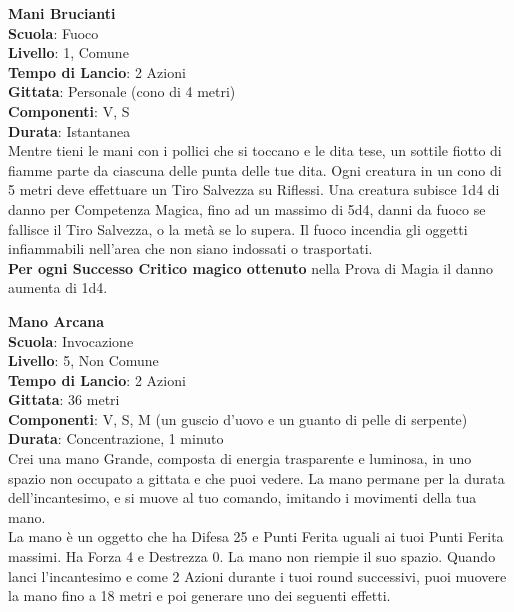 \begin{multicols}{2}
\medskip\textbf{Mani Brucianti}\\
\textbf{Scuola}: Fuoco\\
\textbf{Livello}: 1, Comune\\
\textbf{Tempo di Lancio}: 2 Azioni\\
\textbf{Gittata}: Personale (cono di 4 metri)\\
\textbf{Componenti}: V, S\\
\textbf{Durata}: Istantanea\\
Mentre tieni le mani con i pollici che si toccano e le dita tese, un sottile fiotto di fiamme parte da ciascuna delle punta delle tue dita. Ogni creatura in un cono di 5 metri deve effettuare un Tiro Salvezza su Riflessi. Una creatura subisce 1d4 di danno per Competenza Magica, fino ad un massimo di 5d4, danni da fuoco se fallisce il Tiro Salvezza, o la metà se lo supera. Il fuoco incendia gli oggetti infiammabili nell'area che non siano indossati o trasportati.\\
\textbf{Per ogni Successo Critico magico ottenuto} nella Prova di Magia il danno aumenta di 1d4.

\medskip\textbf{Mano Arcana}\\
\textbf{Scuola}: Invocazione\\
\textbf{Livello}: 5, Non Comune\\
\textbf{Tempo di Lancio}: 2 Azioni\\
\textbf{Gittata}: 36 metri\\
\textbf{Componenti}: V, S, M (un guscio d'uovo e un guanto di pelle di serpente)\\
\textbf{Durata}: Concentrazione, 1 minuto\\
Crei una mano Grande, composta di energia trasparente e luminosa, in uno spazio non occupato a gittata e che puoi vedere. La mano permane per la durata dell'incantesimo, e si muove al tuo comando, imitando i movimenti della tua mano.\\
La mano è un oggetto che ha Difesa 25 e Punti Ferita uguali ai tuoi Punti Ferita massimi. Ha Forza 4 e Destrezza 0. La mano non riempie il suo spazio.
Quando lanci l'incantesimo e come 2 Azioni durante i tuoi round successivi, puoi muovere la mano fino a 18 metri e poi generare uno dei seguenti effetti.\\


\end{multicols}
